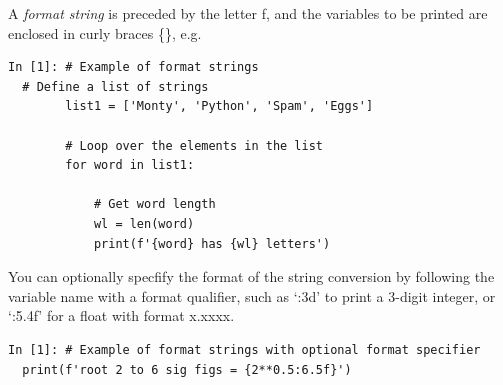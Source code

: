 A \emph{format string} is preceded by the letter f, and the variables to be
printed are enclosed in curly braces \{\}, e.g.
\begin{lstlisting}[style=PY]
  In [1]: # Example of format strings
  # Define a list of strings
        list1 = ['Monty', 'Python', 'Spam', 'Eggs']
        
        # Loop over the elements in the list 
        for word in list1:
        
            # Get word length
            wl = len(word)
            print(f'{word} has {wl} letters')
\end{lstlisting}

You can optionally specfify the format of the string conversion by following the variable name with a format qualifier, such as `:3d' to print a 3-digit integer, or `:5.4f' for a float with format x.xxxx.
\begin{lstlisting}[style=PY]
  In [1]: # Example of format strings with optional format specifier
  print(f'root 2 to 6 sig figs = {2**0.5:6.5f}')
\end{lstlisting}


        
        
